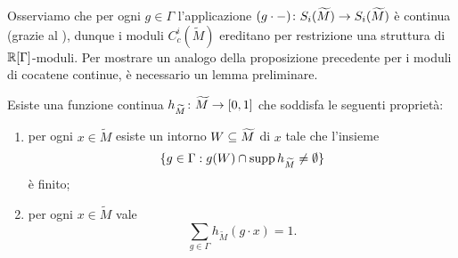 Osserviamo che per ogni $g\in\Gamma$ l'applicazione $\map{(g\cdot{-})}{S_i(\widetilde M)}{S_i(\widetilde M)}$ è continua (grazie al ), dunque i moduli $C^i_c(\widetilde M)$ ereditano per restrizione una struttura di $\mathbb{R}[\Gamma]$-moduli. Per mostrare un analogo della proposizione precedente per i moduli di cocatene continue, è necessario un lemma preliminare.

\begin{lemma}
Esiste una funzione continua $\map{h_{\widetilde M}}{\widetilde M}{[0,1]}$ che soddisfa le seguenti proprietà:
\begin{enumerate}
\item per ogni $x\in\widetilde M$ esiste un intorno $W\subseteq \widetilde M$ di $x$ tale che l'insieme
\[
\{g\in\Gamma:g(W)\cap \operatorname{supp} h_{\widetilde M}\neq\emptyset\}
\]
è finito;
\item per ogni $x\in\widetilde M$ vale
\[
\sum_{g\in\Gamma}h_{\widetilde M}(g\cdot x)=1.
\]
\end{enumerate}
\end{lemma}

